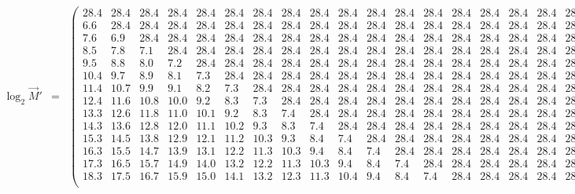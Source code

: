 \begin{footnotesize}
\begin{eqnarray*}
\log_2 \vec{M}' &=& \left(\begin{array}{cccccccccccccccccccc} 
28.4 & 28.4 & 28.4 & 28.4 & 28.4 & 28.4 & 28.4 & 28.4 & 28.4 & 28.4 & 28.4 & 28.4 & 28.4 & 28.4 & 28.4 & 28.4 & 28.4 & 28.4 & 28.4 & 28.4\\
 6.6 & 28.4 & 28.4 & 28.4 & 28.4 & 28.4 & 28.4 & 28.4 & 28.4 & 28.4 & 28.4 & 28.4 & 28.4 & 28.4 & 28.4 & 28.4 & 28.4 & 28.4 & 28.4 & 28.4\\
 7.6 &  6.9 & 28.4 & 28.4 & 28.4 & 28.4 & 28.4 & 28.4 & 28.4 & 28.4 & 28.4 & 28.4 & 28.4 & 28.4 & 28.4 & 28.4 & 28.4 & 28.4 & 28.4 & 28.4\\
 8.5 &  7.8 &  7.1 & 28.4 & 28.4 & 28.4 & 28.4 & 28.4 & 28.4 & 28.4 & 28.4 & 28.4 & 28.4 & 28.4 & 28.4 & 28.4 & 28.4 & 28.4 & 28.4 & 28.4\\
 9.5 &  8.8 &  8.0 &  7.2 & 28.4 & 28.4 & 28.4 & 28.4 & 28.4 & 28.4 & 28.4 & 28.4 & 28.4 & 28.4 & 28.4 & 28.4 & 28.4 & 28.4 & 28.4 & 28.4\\
10.4 &  9.7 &  8.9 &  8.1 &  7.3 & 28.4 & 28.4 & 28.4 & 28.4 & 28.4 & 28.4 & 28.4 & 28.4 & 28.4 & 28.4 & 28.4 & 28.4 & 28.4 & 28.4 & 28.4\\
11.4 & 10.7 &  9.9 &  9.1 &  8.2 &  7.3 & 28.4 & 28.4 & 28.4 & 28.4 & 28.4 & 28.4 & 28.4 & 28.4 & 28.4 & 28.4 & 28.4 & 28.4 & 28.4 & 28.4\\
12.4 & 11.6 & 10.8 & 10.0 &  9.2 &  8.3 &  7.3 & 28.4 & 28.4 & 28.4 & 28.4 & 28.4 & 28.4 & 28.4 & 28.4 & 28.4 & 28.4 & 28.4 & 28.4 & 28.4\\
13.3 & 12.6 & 11.8 & 11.0 & 10.1 &  9.2 &  8.3 &  7.4 & 28.4 & 28.4 & 28.4 & 28.4 & 28.4 & 28.4 & 28.4 & 28.4 & 28.4 & 28.4 & 28.4 & 28.4\\
14.3 & 13.6 & 12.8 & 12.0 & 11.1 & 10.2 &  9.3 &  8.3 &  7.4 & 28.4 & 28.4 & 28.4 & 28.4 & 28.4 & 28.4 & 28.4 & 28.4 & 28.4 & 28.4 & 28.4\\
15.3 & 14.5 & 13.8 & 12.9 & 12.1 & 11.2 & 10.3 &  9.3 &  8.4 &  7.4 & 28.4 & 28.4 & 28.4 & 28.4 & 28.4 & 28.4 & 28.4 & 28.4 & 28.4 & 28.4\\
16.3 & 15.5 & 14.7 & 13.9 & 13.1 & 12.2 & 11.3 & 10.3 &  9.4 &  8.4 &  7.4 & 28.4 & 28.4 & 28.4 & 28.4 & 28.4 & 28.4 & 28.4 & 28.4 & 28.4\\
17.3 & 16.5 & 15.7 & 14.9 & 14.0 & 13.2 & 12.2 & 11.3 & 10.3 &  9.4 &  8.4 &  7.4 & 28.4 & 28.4 & 28.4 & 28.4 & 28.4 & 28.4 & 28.4 & 28.4\\
18.3 & 17.5 & 16.7 & 15.9 & 15.0 & 14.1 & 13.2 & 12.3 & 11.3 & 10.4 &  9.4 &  8.4 &  7.4 & 28.4 & 28.4 & 28.4 & 28.4 & 28.4 & 28.4 & 28.4\\

\end{array}
\end{eqnarray*}
\end{footnotesize}
